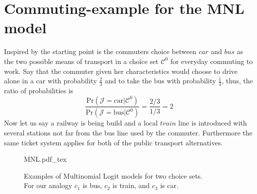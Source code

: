
\FloatBarrier

\section{Commuting-example for the MNL model}
\label{sec: MNL_example}
Inspired by \citet{koppelman_self_2006} the starting point is the commuters choice between $car$ and $bus$ as the two possible means of transport in a choice set $\mathcal{C}^0$ for everyday commuting to work. Say that the commuter given her characteristics would choose to drive alone in a car with probability $\frac{2}{3}$ and to take the bus with probability $\frac{1}{3}$, thus, the ratio of probabilities is
  \begin{equation} \label{eq: bus_car}
    \frac{\textrm{Pr}(\mathcal{J}=\textrm{car}|\mathcal{C}^0)}
    {\textrm{Pr}(\mathcal{J}=\textrm{bus}|\mathcal{C}^0)}=
    \frac{2/3}{1/3}=2
  \end{equation}
Now let us say a railway is being build and a local $train$ line is introduced with several stations not far from the bus line used by the commuter. Furthermore the same ticket system applies for both of the public transport alternatives.


  \begin{figure}[!h]
    \begin{center}
    \def\svgwidth{0.70\columnwidth}
    {MNL.pdf_tex}
    \caption{Examples of Multinomial Logit models for two choice sets. \\
    For our analogy $c_1$ is bus, $c_2$ is train, and $c_3$ is car.}
    \label{fig: MNL}
    \end{center}
  \end{figure}


